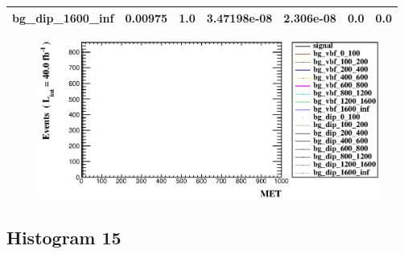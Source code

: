 \documentclass[a4paper, 10pt]{article}
\begin{document}
\begin{table}[H]
\begin{center}
\begin{tabular}{|m{23.0mm}|m{23.0mm}|m{18.0mm}|m{19.0mm}|m{19.0mm}|m{19.0mm}|m{19.0mm}|}
      \hline
      {\cellcolor{white}         bg\_dip\_1600\_inf}& {\cellcolor{white}         0.00975}& {\cellcolor{white}         1.0}& {\cellcolor{white}         3.47198e-08}& {\cellcolor{white}         2.306e-08}& {\cellcolor{green}         0.0}& {\cellcolor{green}         0.0}\\
\hline
    \end{tabular}
  \end{center}
\end{table}

\begin{figure}[H]
  \begin{center}
    \includegraphics[scale=0.45]{selection_13.eps}\\
\caption{   }
  \end{center}
\end{figure}
      \newpage
\subsection{ Histogram 15}
\end{document}
